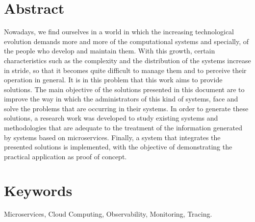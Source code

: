 
\section*{Abstract}
\label{sec:abstract}

Nowadays, we find ourselves in a world in which the increasing technological evolution demands more and more of the computational systems and specially, of the people who develop and maintain them. With this growth, certain characteristics such as the complexity and the distribution of the systems increase in stride, so that it becomes quite difficult to manage them and to perceive their operation in general. It is in this problem that this work aims to provide solutions. The main objective of the solutions presented in this document are to improve the way in which the administrators of this kind of systems, face and solve the problems that are occurring in their systems. In order to generate these solutions, a research work was developed to study existing systems and methodologies that are adequate to the treatment of the information generated by systems based on microservices. Finally, a system that integrates the presented solutions is implemented, with the objective of demonstrating the practical application as proof of concept.

\section*{Keywords}
\label{sec:keywords}

Microservices, Cloud Computing, Observability, Monitoring, Tracing.

\restoregeometry